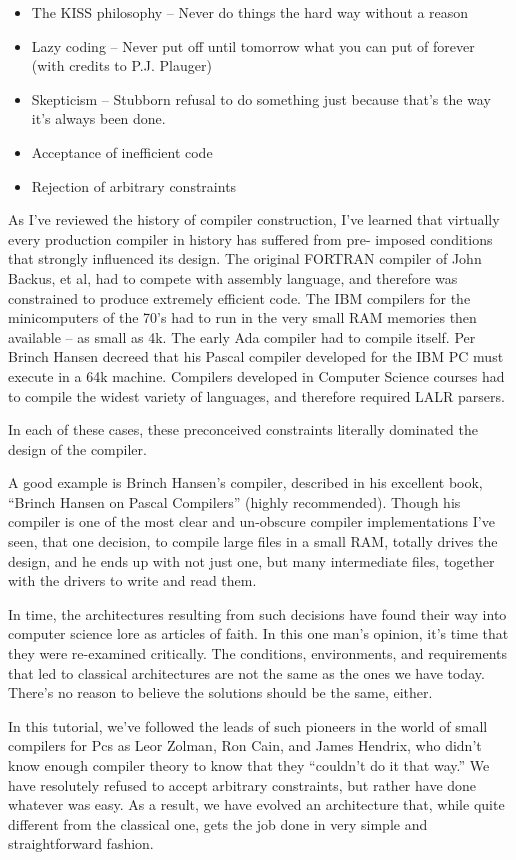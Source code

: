 \begin{itemize}
\item	The KISS philosophy -- Never do things the hard way without a reason
\item	Lazy coding -- Never put off until tomorrow what you can put of forever (with credits to P.J. Plauger)
\item	Skepticism -- Stubborn refusal to do something just because that's the way it's always been done.
\item	Acceptance of inefficient code
\item	Rejection of arbitrary constraints
\end{itemize}

As I've reviewed the history of compiler construction, I've learned that virtually every production compiler in history has suffered from pre- imposed conditions that strongly influenced its design. The original FORTRAN compiler of John Backus, et al, had to compete with assembly language, and therefore was constrained to produce extremely efficient code. The IBM compilers for the minicomputers of the 70's had to run in the very small RAM memories then available -- as small as 4k. The early Ada compiler had to compile itself. Per Brinch Hansen decreed that his Pascal compiler developed for the IBM PC must execute in a 64k machine. Compilers developed in Computer Science courses had to compile the widest variety of languages, and therefore required LALR parsers.

In each of these cases, these preconceived constraints literally dominated the design of the compiler.

A good example is Brinch Hansen's compiler, described in his excellent book, ``Brinch Hansen on Pascal Compilers'' (highly recommended). Though his compiler is one of the most clear and un-obscure compiler implementations I've seen, that one decision, to compile large files in a small RAM, totally drives the design, and he ends up with not just one, but many intermediate files, together with the drivers to write and read them.

In time, the architectures resulting from such decisions have found their way into computer science lore as articles of faith. In this one man's opinion, it's time that they were re-examined critically. The conditions, environments, and requirements that led to classical architectures are not the same as the ones we have today. There's no reason to believe the solutions should be the same, either.

In this tutorial, we've followed the leads of such pioneers in the world of small compilers for Pcs as Leor Zolman, Ron Cain, and James Hendrix, who didn't know enough compiler theory to know that they ``couldn't do it that way.''  We have resolutely refused to accept arbitrary constraints, but rather have done whatever was easy. As a result, we have evolved an architecture that, while quite different from the classical one, gets the job done in very simple and straightforward fashion.

